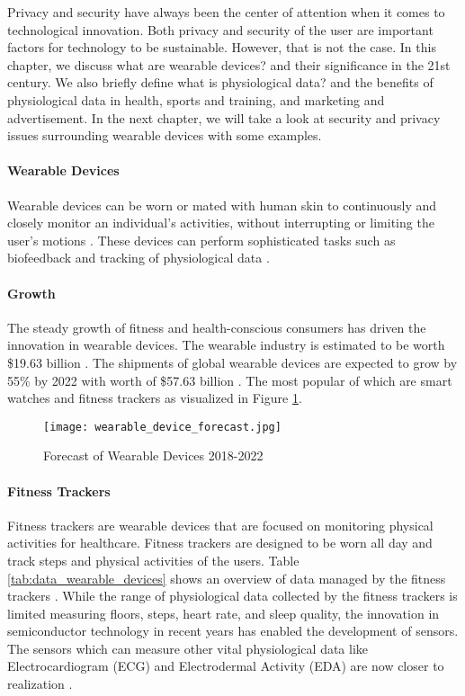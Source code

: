\label{chapter:introduction}
Privacy and security have always been the center of attention when it comes to technological innovation. Both privacy and security of the user are important factors for technology to be sustainable. However, that is not the case. In this chapter, we discuss what are wearable devices? and their significance in the 21st century. We also briefly define what is physiological data? and the benefits of physiological data in health, sports and training, and marketing and advertisement. In the next chapter, we will take a look at security and privacy issues surrounding wearable devices with some examples. 

\paragraph{Wearable Devices}
Wearable devices can be worn or mated with human skin to continuously and closely monitor an individual’s activities, without interrupting or limiting the user’s motions \cite{gao_fully_2016}. These devices can perform sophisticated tasks such as biofeedback and tracking of physiological data \cite{noauthor_wearable_nodate}.

\paragraph{Growth} The steady growth of fitness and health-conscious consumers has driven the innovation in wearable devices. The wearable industry is estimated to be worth \$19.63 billion \cite{noauthor_wearable_market_nodate}. The shipments of global wearable devices are expected to grow by 55\% by 2022 \cite{WearableStudy} with worth of \$57.63 billion \cite{noauthor_wearable_market_nodate}. The most popular of which are smart watches and fitness trackers as visualized in Figure \ref{fig:forecast_of_wearable_devices}.

\begin{figure}
    \centering
    \texttt{[image: wearable\_device\_forecast.jpg]}
    \caption{Forecast of Wearable Devices 2018-2022 \cite{WearableStudy}}
    \label{fig:forecast_of_wearable_devices}
\end{figure}


\paragraph{Fitness Trackers}
Fitness trackers are wearable devices that are focused on monitoring physical activities for healthcare. Fitness trackers are designed to be worn all day and track steps and physical activities of the users. Table \ref{tab:data_wearable_devices} shows an overview of data managed by the fitness trackers \cite{mendoza_assessment_2018}. While the range of physiological data collected by the fitness trackers is limited measuring floors, steps, heart rate, and sleep quality, the innovation in semiconductor technology in recent years has enabled the development of sensors. The sensors which can measure other vital physiological data like Electrocardiogram (ECG) and Electrodermal Activity (EDA) are now closer to realization \cite{haghi_wearable_2017}. 

